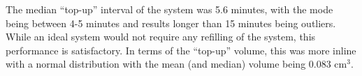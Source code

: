 The median ``top-up'' interval of the system was 5.6 minutes, with the mode being between 4-5 minutes and results longer than 15 minutes being outliers. While an ideal system would not require any refilling of the system, this performance is satisfactory. In terms of the ``top-up'' volume, this was more inline with a normal distribution with the mean (and median) volume being 0.083 cm$^3$.









%
%
%
%
%
%
%
%


%





